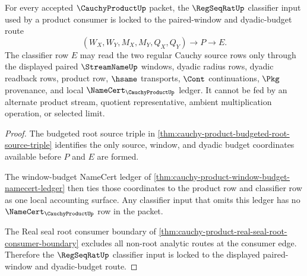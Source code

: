 \begin{theorem}
\label{thm:cauchy-product-root-regseqrat-classifier-lock}
For every accepted $\CauchyProductUp$ packet, the $\RegSeqRatUp$ classifier input used by a product consumer is locked to the paired-window and dyadic-budget route
$$
(W_X,W_Y,M_X,M_Y,Q_X,Q_Y)\longrightarrow P\longrightarrow E.
$$
The classifier row $E$ may read the two regular Cauchy source rows only through the displayed paired $\StreamNameUp$ windows, dyadic radius rows, dyadic readback rows, product row, $\hsame$ transports, $\Cont$ continuations, $\Pkg$ provenance, and local $\NameCert_{\CauchyProductUp}$ ledger. It cannot be fed by an alternate product stream, quotient representative, ambient multiplication operation, or selected limit.
\end{theorem}
\begin{proof}
The budgeted root source triple in \autoref{thm:cauchy-product-budgeted-root-source-triple} identifies the only source, window, and dyadic budget coordinates available before $P$ and $E$ are formed.

The window-budget NameCert ledger of \autoref{thm:cauchy-product-window-budget-namecert-ledger} then ties those coordinates to the product row and classifier row as one local accounting surface. Any classifier input that omits this ledger has no $\NameCert_{\CauchyProductUp}$ row in the packet.

The Real seal root consumer boundary of \autoref{thm:cauchy-product-real-seal-root-consumer-boundary} excludes all non-root analytic routes at the consumer edge. Therefore the $\RegSeqRatUp$ classifier input is locked to the displayed paired-window and dyadic-budget route.
\end{proof}

